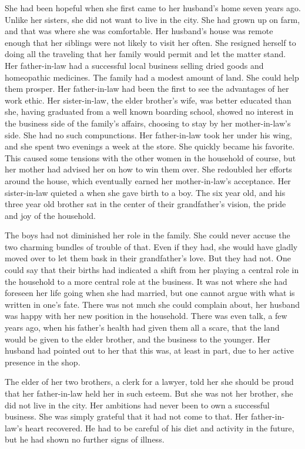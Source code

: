 \documentclass{article}
\begin{document}
She had been hopeful when she first came to her husband's home seven years ago. Unlike her sisters, she did not want to live in the city. She had grown up on farm, and that was where she was comfortable. Her husband's house was remote enough that her siblings were not likely to visit her often. She resigned herself to doing all the traveling that her family would permit and let the matter stand. Her father-in-law had a successful local business selling dried goods and homeopathic medicines. The family had a modest amount of land. She could help them prosper. Her father-in-law had been the first to see the advantages of her work ethic. Her sister-in-law, the elder brother's wife, was better educated than she, having graduated from a well known boarding school, showed no interest in the business side of the family's affairs, choosing to stay by her mother-in-law's side. She had no such compunctions. Her father-in-law took her under his wing, and she spent two evenings a week at the store. She quickly became his favorite. This caused some tensions with the other women in the household of course, but her mother had advised her on how to win them over. She redoubled her efforts around the house, which eventually earned her mother-in-law's acceptance. Her sister-in-law quieted a when she gave birth to a boy. The six year old, and his three year old brother sat in the center of their grandfather's vision, the pride and joy of the household.

The boys had not diminished her role in the family. She could never accuse the two charming bundles of trouble of that. Even if they had, she would have  gladly moved over to let them bask in their grandfather's love. But they had not. One could say that their births had indicated a shift from her playing a central role in the household to a more central role at the business. It was not where she had foreseen her life going when she had married, but one cannot argue with what is written in one's fate. There was not much she could complain about, her husband was happy with her new position in the household. There was even talk, a few years ago, when his father's health had given them all a scare, that the land would be given to the elder brother, and the business to the younger. Her husband had pointed out to her that this was, at least in part, due to her active presence in the shop. 

The elder of her two brothers, a clerk for a lawyer, told her she should be proud that her father-in-law held her in such esteem. But she was not her brother, she did not live in the city. Her ambitions had never been to own a successful business. She was simply grateful that it had not come to that. Her father-in-law's heart recovered. He had to be careful of his diet and activity in the future, but he had shown no further signs of illness.
\end{document}
